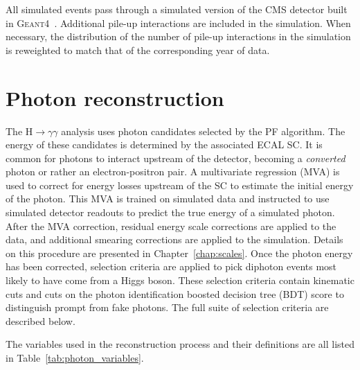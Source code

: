 All simulated events pass through a simulated version of the CMS detector built in \textsc{Geant4}~\cite{geant}. Additional pile-up interactions are included in the simulation. When necessary, the distribution of the number of pile-up interactions in the simulation is reweighted to match that of the corresponding year of data.


\section{Photon reconstruction}

The H$\rightarrow\gamma\gamma$ analysis uses photon candidates selected by the PF algorithm. The energy of these candidates is determined by the associated ECAL SC. It is common for photons to interact upstream of the detector, becoming a \textit{converted} photon or rather an electron-positron pair. A multivariate regression (MVA) is used to correct for energy losses upstream of the SC to estimate the initial energy of the photon. This MVA is trained on simulated data and instructed to use simulated detector readouts to predict the true energy of a simulated photon. After the MVA correction, residual energy scale corrections are applied to the data, and additional smearing corrections are applied to the simulation. Details on this procedure are presented in Chapter~\ref{chap:scales}. Once the photon energy has been corrected, selection criteria are applied to pick diphoton events most likely to have come from a Higgs boson. These selection criteria contain kinematic cuts and cuts on the photon identification boosted decision tree (BDT) score to distinguish prompt from fake photons. The full suite of selection criteria are described below.

The variables used in the reconstruction process and their definitions are all listed in Table~\ref{tab:photon_variables}.


